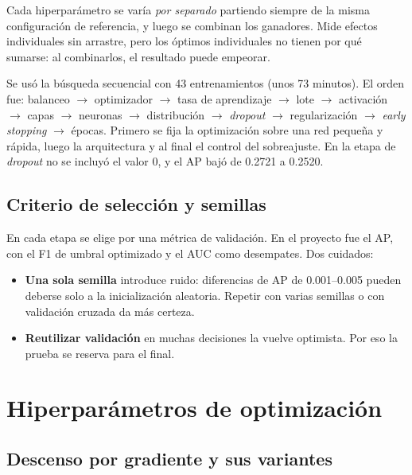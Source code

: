 \documentclass[11pt,a4paper]{article}
\begin{document}
Cada hiperparámetro se varía \emph{por separado} partiendo siempre de la misma configuración de referencia, y luego se combinan los ganadores. Mide efectos individuales sin arrastre, pero los óptimos individuales no tienen por qué sumarse: al combinarlos, el resultado puede empeorar.

\begin{proyecto}
Se usó la búsqueda secuencial con 43 entrenamientos (unos 73 minutos). El orden fue: balanceo $\rightarrow$ optimizador $\rightarrow$ tasa de aprendizaje $\rightarrow$ lote $\rightarrow$ activación $\rightarrow$ capas $\rightarrow$ neuronas $\rightarrow$ distribución $\rightarrow$ \textit{dropout} $\rightarrow$ regularización $\rightarrow$ \textit{early stopping} $\rightarrow$ épocas. Primero se fija la optimización sobre una red pequeña y rápida, luego la arquitectura y al final el control del sobreajuste. En la etapa de \textit{dropout} no se incluyó el valor 0, y el AP bajó de 0.2721 a 0.2520.
\end{proyecto}

\subsection{Criterio de selección y semillas}

En cada etapa se elige por una métrica de validación. En el proyecto fue el AP, con el F1 de umbral optimizado y el AUC como desempates. Dos cuidados:
\begin{itemize}
\item \textbf{Una sola semilla} introduce ruido: diferencias de AP de 0.001--0.005 pueden deberse solo a la inicialización aleatoria. Repetir con varias semillas o con validación cruzada da más certeza.
\item \textbf{Reutilizar validación} en muchas decisiones la vuelve optimista. Por eso la prueba se reserva para el final.
\end{itemize}

\section{Hiperparámetros de optimización}

\subsection{Descenso por gradiente y sus variantes}
\end{document}
